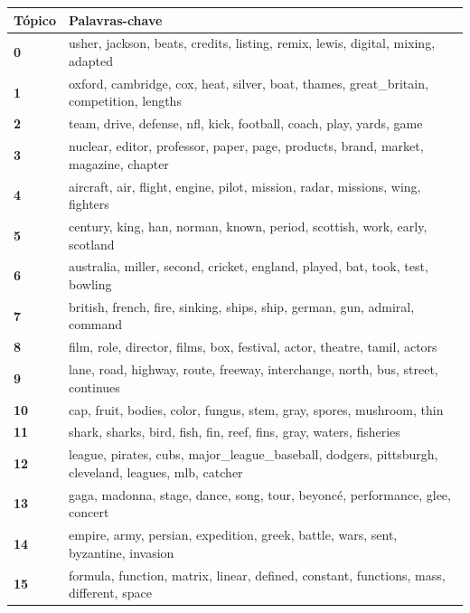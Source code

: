 \begin{table}[htpb]
    \centering
    \scriptsize
    \begin{tabularx}{\textwidth}{@{}l X@{}}
        \toprule
        \textbf{Tópico} & \textbf{Palavras-chave} \\
        \midrule
        \textbf{0} & usher, jackson, beats, credits, listing, remix, lewis, digital, mixing, adapted \\
        \textbf{1} & oxford, cambridge, cox, heat, silver, boat, thames, great\_britain, competition, lengths \\
        \textbf{2} & team, drive, defense, nfl, kick, football, coach, play, yards, game \\
        \textbf{3} & nuclear, editor, professor, paper, page, products, brand, market, magazine, chapter \\
        \textbf{4} & aircraft, air, flight, engine, pilot, mission, radar, missions, wing, fighters \\
        \textbf{5} & century, king, han, norman, known, period, scottish, work, early, scotland \\
        \textbf{6} & australia, miller, second, cricket, england, played, bat, took, test, bowling \\
        \textbf{7} & british, french, fire, sinking, ships, ship, german, gun, admiral, command \\
        \textbf{8} & film, role, director, films, box, festival, actor, theatre, tamil, actors \\
        \textbf{9} & lane, road, highway, route, freeway, interchange, north, bus, street, continues \\
        \textbf{10} & cap, fruit, bodies, color, fungus, stem, gray, spores, mushroom, thin \\
        \textbf{11} & shark, sharks, bird, fish, fin, reef, fins, gray, waters, fisheries \\
        \textbf{12} & league, pirates, cubs, major\_league\_baseball, dodgers, pittsburgh, cleveland, leagues, mlb, catcher \\
        \textbf{13} & gaga, madonna, stage, dance, song, tour, beyoncé, performance, glee, concert \\
        \textbf{14} & empire, army, persian, expedition, greek, battle, wars, sent, byzantine, invasion \\
        \textbf{15} & formula, function, matrix, linear, defined, constant, functions, mass, different, space \\

\end{tabularx}
\end{table}
